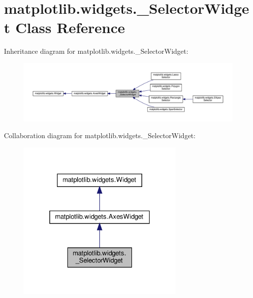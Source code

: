 \hypertarget{classmatplotlib_1_1widgets_1_1__SelectorWidget}{}\section{matplotlib.\+widgets.\+\_\+\+Selector\+Widget Class Reference}
\label{classmatplotlib_1_1widgets_1_1__SelectorWidget}


Inheritance diagram for matplotlib.\+widgets.\+\_\+\+Selector\+Widget\+:
\nopagebreak
\begin{figure}[H]
\begin{center}
\leavevmode
\includegraphics[width=350pt]{classmatplotlib_1_1widgets_1_1__SelectorWidget__inherit__graph}
\end{center}
\end{figure}


Collaboration diagram for matplotlib.\+widgets.\+\_\+\+Selector\+Widget\+:
\nopagebreak
\begin{figure}[H]
\begin{center}
\leavevmode
\includegraphics[width=232pt]{classmatplotlib_1_1widgets_1_1__SelectorWidget__coll__graph}
\end{center}
\end{figure}
